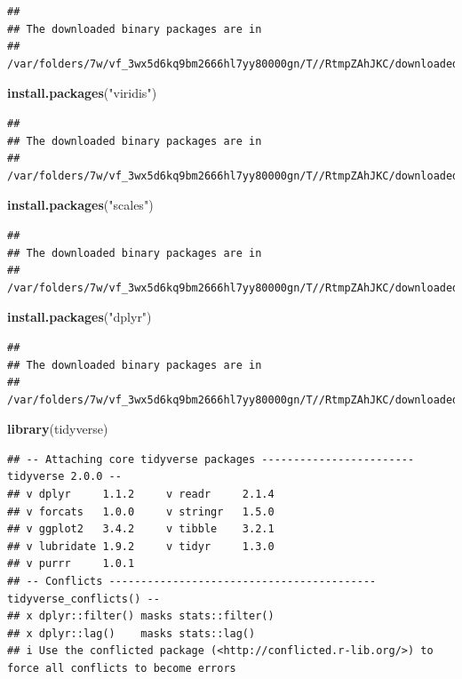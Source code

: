 \documentclass[
]{article}
\newenvironment{Shaded}{\begin{snugshade}}{\end{snugshade}}
\newcommand{\FunctionTok}[1]{\textcolor[rgb]{0.13,0.29,0.53}{\textbf{#1}}}
\newcommand{\NormalTok}[1]{#1}
\newcommand{\StringTok}[1]{\textcolor[rgb]{0.31,0.60,0.02}{#1}}
\begin{document}
\begin{verbatim}
## 
## The downloaded binary packages are in
##  /var/folders/7w/vf_3wx5d6kq9bm2666hl7yy80000gn/T//RtmpZAhJKC/downloaded_packages
\end{verbatim}

\begin{Shaded}
\begin{Highlighting}[]
    \FunctionTok{install.packages}\NormalTok{(}\StringTok{"viridis"}\NormalTok{)}
\end{Highlighting}
\end{Shaded}

\begin{verbatim}
## 
## The downloaded binary packages are in
##  /var/folders/7w/vf_3wx5d6kq9bm2666hl7yy80000gn/T//RtmpZAhJKC/downloaded_packages
\end{verbatim}

\begin{Shaded}
\begin{Highlighting}[]
    \FunctionTok{install.packages}\NormalTok{(}\StringTok{"scales"}\NormalTok{)}
\end{Highlighting}
\end{Shaded}

\begin{verbatim}
## 
## The downloaded binary packages are in
##  /var/folders/7w/vf_3wx5d6kq9bm2666hl7yy80000gn/T//RtmpZAhJKC/downloaded_packages
\end{verbatim}

\begin{Shaded}
\begin{Highlighting}[]
    \FunctionTok{install.packages}\NormalTok{(}\StringTok{"dplyr"}\NormalTok{)}
\end{Highlighting}
\end{Shaded}

\begin{verbatim}
## 
## The downloaded binary packages are in
##  /var/folders/7w/vf_3wx5d6kq9bm2666hl7yy80000gn/T//RtmpZAhJKC/downloaded_packages
\end{verbatim}

\begin{Shaded}
\begin{Highlighting}[]
    \FunctionTok{library}\NormalTok{(tidyverse)}
\end{Highlighting}
\end{Shaded}

\begin{verbatim}
## -- Attaching core tidyverse packages ------------------------ tidyverse 2.0.0 --
## v dplyr     1.1.2     v readr     2.1.4
## v forcats   1.0.0     v stringr   1.5.0
## v ggplot2   3.4.2     v tibble    3.2.1
## v lubridate 1.9.2     v tidyr     1.3.0
## v purrr     1.0.1     
## -- Conflicts ------------------------------------------ tidyverse_conflicts() --
## x dplyr::filter() masks stats::filter()
## x dplyr::lag()    masks stats::lag()
## i Use the conflicted package (<http://conflicted.r-lib.org/>) to force all conflicts to become errors
\end{verbatim}
\end{document}
